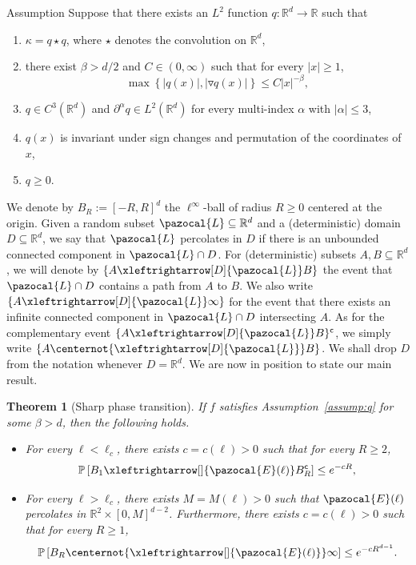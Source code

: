 \documentclass[10pt]{amsart}
\newtheorem{theo}{Theorem}[section]
\theoremstyle{definition}\newtheorem{defi}[theo]{Definition}\newtheorem{rema}[theo]{Remark}\newtheorem{exam}[theo]{Example}\newtheorem{exem}[theo]{Example}\newtheorem{nota}[theo]{Notation}
\renewcommand{\P}{\mathbb{P}}
\newcommand{\R}{\mathbb{R}}
\newcommand{\sfc}{\mathsf{c}}
\newcommand{\lr}[4]{#3\xleftrightarrow[#1]{#2} #4}
\newcommand{\nlr}[4]{#3\centernot{\xleftrightarrow[#1]{#2}} #4}
\newcommand*{\romanenumi}{\renewcommand*{\theenumi}{\roman{enumi}}}
\begin{document}
\begin{enonce}{Assumption}\label{assump:q}
Suppose that there exists an $L^2$ function $q:\R^d\to\R$ such that
\begin{enumerate}\romanenumi
\item\label{Assum1.1.i} $\kappa=q\star q$, where $\star$ denotes the convolution on $\R^d$,
\item\label{Assum1.1.ii} there exist $\beta>d/2$ and $C\in(0,\infty)$ such that for every $|x|\geq1$,
\begin{equation}\label{eq:decay_q}
\max\left\{|q(x)|, \left|\triangledown q(x)\right|\right\}\leq C|x|^{-\beta},
\end{equation}
\item\label{Assum1.1.iii} $q\in C^3(\R^d)$ and $\partial^\alpha q\in L^2(\R^d)$ for every multi-index $\alpha$ with $|\alpha|\leq3$,
\item\label{Assum1.1.iv} $q(x)$ is invariant under sign changes and permutation of the coordinates of $x$,
\item\label{Assum1.1.v} $q\geq 0$.
\end{enumerate}
\end{enonce}


We denote by $B_R:=[-R,R]^d$ the $\ell^\infty$-ball of radius $R\geq0$ centered at the origin. Given a random subset $\pazocal{L}\subseteq\R^d$ and a (deterministic) domain $D\subseteq \R^d$, we say that $\pazocal{L}$ percolates in $D$ if there is an unbounded connected component in $\pazocal{L}\cap D$. For (deterministic) subsets $A,B\subseteq\R^d$, we will denote by
{\small$\{\lr{D}{\pazocal{L}}{A}{B}\}$}
the event that $\pazocal{L}\cap D$ contains a path from $A$ to $B$. We also write
{\small$\{\lr{D}{\pazocal{L}}{A}{\infty}\}
$}
for the event that there exists an infinite connected component in $\pazocal{L}\cap D$ intersecting $A$. As for the complementary event
$\{\lr{D}{\pazocal{L}}{A}{B}\}^{\sfc}$,
we simply write {\small$\{\nlr{D}{\pazocal{L}}{A}{B}\}$}.
We shall drop $D$ from the notation whenever $D=\R^d$. We are now in position to state our main result.


\begin{theo}[Sharp phase transition]\label{thm:sharpness}
If $f$ satisfies Assumption~\ref{assump:q} for some $\beta>d$, then the following holds.
\begin{itemize}
\item For every $\ell<\ell_c$, there exists $c=c(\ell)>0$ such that for every $R\geq2$,
\begin{equation}\label{eq:exp_decay}
\P\left[\lr{}{\pazocal{E}(\ell)}{B_1}{B_R^{\sfc}}\right]\leq e^{-cR},
\end{equation}
\item For every $\ell>\ell_c$, there exists $M=M(\ell)>0$ such that $\pazocal{E}(\ell)$ percolates in $\R^2\times[0,M]^{d-2}$. Furthermore, there exists $c=c(\ell)>0$ such that for every $R\geq1$,
\begin{equation}\label{eq:exp_decay2}
\P\left[\nlr{}{\pazocal{E}(\ell)}{B_R}{\infty}\right]\leq e^{-cR^{d-1}}.
\end{equation}
\end{itemize}
\end{theo}
\end{document}
